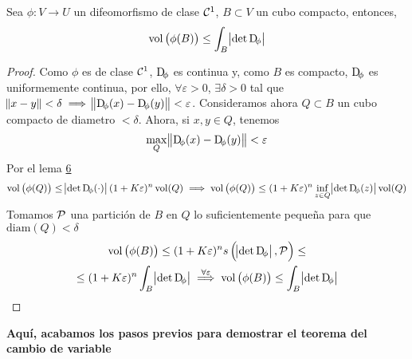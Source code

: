 \begin{lema*}[7]\label{lema:siete_cambio}
    Sea $\phi \colon V \to U$ un difeomorfismo de clase $\mathcal{C}^1$, $B \subset V$ un cubo compacto, entonces,
    \[
        \vol\left( \phi(B) \right) \leq \int_B \abs{\det \Dif_\phi}
    \]
\end{lema*}

\begin{proof}
    Como $\phi$ es de clase $\mathcal{C}^1$, $\Dif_\phi$ es continua y, como $B$ es compacto, $\Dif_\phi$ es uniformemente continua, por ello,
    $\forall \varepsilon > 0$, $\exists \delta > 0$ tal que $\norm{x - y} < \delta \implies \norm{\Dif_\phi(x) - \Dif_\phi(y)} < \varepsilon$.
    Consideramos ahora $Q \subset B$ un cubo compacto de diametro $< \delta$. Ahora, si $x,y \in Q$, tenemos
    \[
        \max_{Q} \norm{\Dif_\phi(x) - \Dif_\phi(y)} < \varepsilon
    \]
    Por el lema \hyperref[lema:seis_cambio]{6}
    \[
        \vol\left( \phi(Q) \right) \leq \abs{\det \Dif_\phi(\cdot)} (1+K\varepsilon)^n \vol(Q) \implies
        \vol\left( \phi(Q) \right) \leq (1+K\varepsilon)^n\inf_{z \in Q} \abs{\det \Dif_\phi(z)} \vol(Q)
    \]
    Tomamos $\mathcal{P}$ una partición de $B$ en $Q$ lo suficientemente pequeña para que $\text{diam}(Q) < \delta$
    \begin{gather*}
        \vol\left( \phi(B) \right) \leq (1+K\varepsilon)^n s\left( \abs{\det \Dif_\phi}, \Pa \right) \leq \\ \leq  (1+K\varepsilon)^n \int_B \abs{\det \Dif_\phi}
        \stackrel{\forall \varepsilon}{\implies} \vol\left( \phi(B) \right) \leq \int_B \abs{\det \Dif_\phi}
    \end{gather*}
\end{proof}

\textbf{Aquí, acabamos los pasos previos para demostrar el teorema del cambio de variable}

